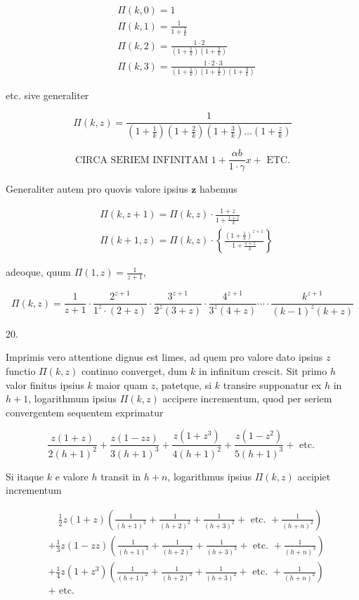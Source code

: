 \documentclass[10pt]{article}
\begin{document}
\[
\begin{aligned}
& \Pi(k, 0)=1 \\
& \Pi(k, 1)=\frac{1}{1+\frac{1}{k}} \\
& \Pi(k, 2)=\frac{1 \cdot 2}{\left(1+\frac{1}{k}\right)\left(1+\frac{2}{k}\right)} \\
& \Pi(k, 3)=\frac{1 \cdot 2 \cdot 3}{\left(1+\frac{1}{k}\right)\left(1+\frac{2}{k}\right)\left(1+\frac{3}{k}\right)}
\end{aligned}
\]

etc. sive generaliter

\[
\Pi(k, z)=\frac{1}{\left(1+\frac{1}{k}\right)\left(1+\frac{2}{k}\right)\left(1+\frac{3}{k}\right) \ldots\left(1+\frac{z}{k}\right)}
\]

\[
\text { CIRCA SERIEM INFINITAM } 1+\frac{\alpha b}{1 \cdot \gamma} x+\text { ETC. }
\]

Generaliter autem pro quovis valore ipsius \(\boldsymbol{z}\) habemus

\[
\begin{aligned}
& \Pi(k, z+1)=\Pi(k, z) \cdot \frac{1+z}{1+\frac{1+z}{k}} \\
& \Pi(k+1, z)=\Pi(k, z) \cdot\left\{\frac{\left(1+\frac{1}{k}\right)^{z+1}}{1+\frac{1+z}{k}}\right\}
\end{aligned}
\]

adeoque, quum \(\Pi(1, z)=\frac{1}{z+1}\),

\[
\Pi(k, z)=\frac{1}{z+1} \cdot \frac{2^{z+1}}{1^{z} \cdot(2+z)} \cdot \frac{3^{z+1}}{2^{z}(3+z)} \cdot \frac{4^{z+1}}{3^{z}(4+z)} \cdots \cdot \frac{k^{z+1}}{(k-1)^{z}(k+z)}
\]

20.

Imprimis vero attentione dignus est limes, ad quem pro valore dato ipsius \(z\) functio \(\Pi(k, z)\) continuo converget, dum \(k\) in infinitum crescit. Sit primo \(h\) valor finitus ipsius \(k\) maior quam \(z\), patetque, si \(k\) transire supponatur ex \(h\) in \(h+1\), logarithmum ipsius \(\Pi(k, z)\) accipere incrementum, quod per seriem convergentem sequentem exprimatur

\[
\frac{z(1+z)}{2(h+1)^{2}}+\frac{z(1-z z)}{3(h+1)^{3}}+\frac{z\left(1+z^{3}\right)}{4(h+1)^{2}}+\frac{z\left(1-z^{2}\right)}{5(h+1)^{3}}+\text { etc. }
\]

Si itaque \(k\) e valore \(h\) transit in \(h+n\), logarithmus ipsius \(\Pi(k, z)\) accipiet incrementum

\[
\begin{aligned}
& \quad \frac{1}{2} z(1+z)\left(\frac{1}{(h+1)^{2}}+\frac{1}{(h+2)^{2}}+\frac{1}{(h+3)^{2}}+\text { etc. }+\frac{1}{(h+n)^{2}}\right) \\
& +\frac{1}{3} z(1-z z)\left(\frac{1}{(h+1)^{2}}+\frac{1}{(h+2)^{3}}+\frac{1}{(h+3)^{3}}+\text { etc. }+\frac{1}{(h+n)^{3}}\right) \\
& +\frac{1}{4} z\left(1+z^{3}\right)\left(\frac{1}{(h+1)^{2}}+\frac{1}{(h+2)^{2}}+\frac{1}{(h+3)^{2}}+\text { etc. }+\frac{1}{(h+n)^{2}}\right) \\
& + \text { etc. }
\end{aligned}
\]
\end{document}
